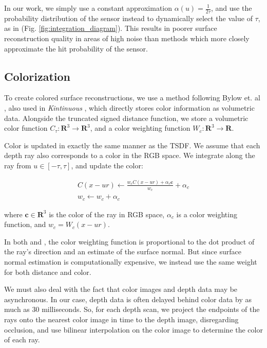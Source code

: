 In our work, we simply use a constant approximation $\alpha(u) = \frac{1}{2
\tau}$, and use the probability distribution of the sensor instead to 
dynamically select the value of $\tau$, as in \cite{Nguyen2012} (Fig.
\ref{fig:integration_diagram}). This results in poorer surface reconstruction
quality in areas of high noise than methods which more closely approximate the
hit probability of the sensor.

\subsection{Colorization}
To create colored surface reconstructions, we use a method following Bylow et.
al \cite{Bylow2013}, also used in \textit{Kintinuous} \cite{Whelan2013}, which
directly stores color information as volumetric data. Alongside the
truncated signed distance function, we store a volumetric color function
$C_\tau : \mathbf{R}^3 \to \mathbf{R}^3$, and a color weighting function $W_c :
\mathbf{R}^3 \to \mathbf{R}$.

Color is updated in exactly the same manner as the TSDF. We assume that each
depth ray also corresponds to a color in the RGB space. We integrate along the
ray from $u \in [-\tau, \tau]$, and update the color:

\begin{align}
C(x - ur) \gets \frac{w_c C(x - ur) + \alpha_c \mathbf{c}}{w_c}
+\alpha_c
\\
%
w_c \gets w_c + \alpha_c
\end{align}

\noindent where $\mathbf{c} \in \mathbf{R}^3$ is the color of the ray in RGB
space, $\alpha_c$ is a color weighting function, and $w_c = W_c(x -
ur)$.

In both \cite{Bylow2013} and \cite{Whelan2013}, the color weighting function is
proportional to the dot product of the ray's direction and an estimate of the
surface normal. But since surface normal estimation is computationally
expensive, we instead use the same weight for both distance and color.

We must also deal with the fact that color images and depth data may be
asynchronous. In our case, depth data is often delayed behind color data by as
much as 30 milliseconds. So, for each depth scan, we project the endpoints of
the rays onto the nearest color image in time to the depth image, disregarding
occlusion, and use bilinear interpolation on the color image to determine the
color of each ray.

